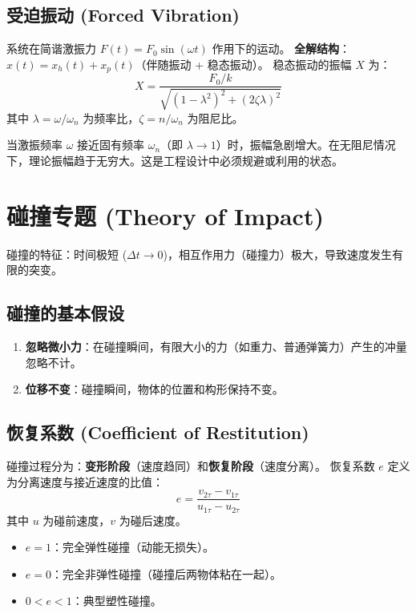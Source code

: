 \documentclass[12pt,a4paper]{article}
\begin{document}
\subsection{受迫振动 (Forced Vibration)}
系统在简谐激振力 $F(t) = F_0 \sin(\omega t)$ 作用下的运动。
\textbf{全解结构}：$x(t) = x_h(t) + x_p(t)$（伴随振动 + 稳态振动）。
稳态振动的振幅 $X$ 为：
\begin{equation}
    X = \frac{F_0/k}{\sqrt{(1 - \lambda^2)^2 + (2\zeta\lambda)^2}}
\end{equation}
其中 $\lambda = \omega/\omega_n$ 为频率比，$\zeta = n/\omega_n$ 为阻尼比。

\begin{tcolorbox}[colback=red!5, colframe=red!75!black, title=共振 (Resonance)]
    当激振频率 $\omega$ 接近固有频率 $\omega_n$（即 $\lambda \to 1$）时，振幅急剧增大。在无阻尼情况下，理论振幅趋于无穷大。这是工程设计中必须规避或利用的状态。
\end{tcolorbox}



\section{碰撞专题 (Theory of Impact)}

碰撞的特征：时间极短 ($\Delta t \to 0$)，相互作用力（碰撞力）极大，导致速度发生有限的突变。

\subsection{碰撞的基本假设}
\begin{enumerate}
    \item \textbf{忽略微小力}：在碰撞瞬间，有限大小的力（如重力、普通弹簧力）产生的冲量忽略不计。
    \item \textbf{位移不变}：碰撞瞬间，物体的位置和构形保持不变。
\end{enumerate}

\subsection{恢复系数 (Coefficient of Restitution)}
碰撞过程分为：\textbf{变形阶段}（速度趋同）和\textbf{恢复阶段}（速度分离）。
恢复系数 $e$ 定义为分离速度与接近速度的比值：
\begin{equation}
    e = \frac{v_{2\tau} - v_{1\tau}}{u_{1\tau} - u_{2\tau}}
\end{equation}
其中 $u$ 为碰前速度，$v$ 为碰后速度。
\begin{itemize}
    \item $e = 1$：完全弹性碰撞（动能无损失）。
    \item $e = 0$：完全非弹性碰撞（碰撞后两物体粘在一起）。
    \item $0 < e < 1$：典型塑性碰撞。
\end{itemize}
\end{document}
